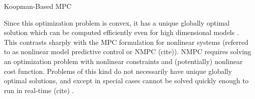 \begin{algorithm}
\SetAlgoLined
{}
 \caption{Koopman-Based MPC}
 \label{alg:mpc}
\end{algorithm}



Since this optimization problem is convex, it has a unique globally optimal solution which can be computed efficiently even for high dimensional models .
This contrasts sharply with the MPC formulation for nonlinear systems (referred to as nonlinear model predictive control or NMPC (cite)).
NMPC requires solving an optimization problem with nonlinear constraints and (potentially) nonlinear cost function.
Problems of this kind do not necessarily have unique globally optimal solutions, and except in special cases cannot be solved quickly enough to run in real-time (cite) .








